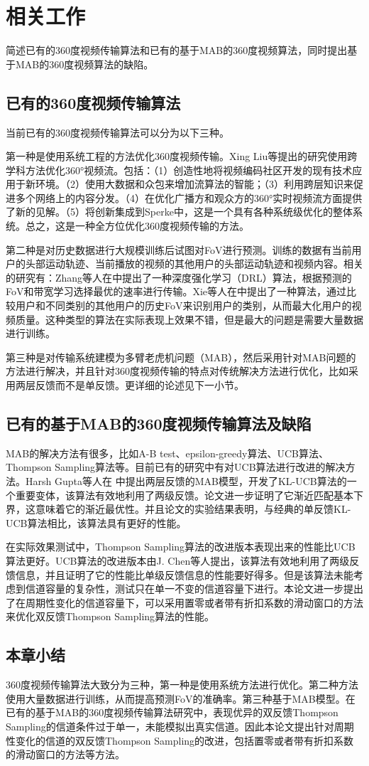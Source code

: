 \chapter{相关工作}
简述已有的360度视频传输算法和已有的基于MAB的360度视频算法，同时提出基于MAB的360度视频算法的缺陷。

\section{已有的360度视频传输算法}
当前已有的360度视频传输算法可以分为以下三种。


第一种是使用系统工程的方法优化360度视频传输。Xing Liu等\cite{ref2}提出的研究使用跨学科方法优化360°视频流。包括：（1）创造性地将视频编码社区开发的现有技术应用于新环境。（2）使用大数据和众包来增加流算法的智能；（3）利用跨层知识来促进多个网络上的内容分发。（4）在优化广播方和观众方的360°实时视频流方面提供了新的见解。（5）将创新集成到Sperke中，这是一个具有各种系统级优化的整体系统。总之，这是一种全方位优化360度视频传输的方法。


第二种是对历史数据进行大规模训练后试图对FoV进行预测。训练的数据有当前用户的头部运动轨迹、当前播放的视频的其他用户的头部运动轨迹和视频内容。相关的研究有：Zhang等人在\cite{ref1}中提出了一种深度强化学习（DRL）算法，根据预测的FoV和带宽学习选择最优的速率进行传输。Xie等人在\cite{ref6}中提出了一种算法，通过比较用户和不同类别的其他用户的历史FoV来识别用户的类别，从而最大化用户的视频质量。这种类型的算法在实际表现上效果不错，但是最大的问题是需要大量数据进行训练。


第三种是对传输系统建模为多臂老虎机问题（MAB），然后采用针对MAB问题的方法进行解决，并且针对360度视频传输的特点对传统解决方法进行优化，比如采用两层反馈而不是单反馈。更详细的论述见下一小节。


\section{已有的基于MAB的360度视频传输算法及缺陷}
MAB的解决方法有很多，比如A-B test、epsilon-greedy算法、UCB算法、Thompson Sampling算法等。目前已有的研究中有对UCB算法进行改进的解决方法。Harsh Gupta等人在\cite{ref7} 中提出两层反馈的MAB模型，开发了KL-UCB算法的一个重要变体，该算法有效地利用了两级反馈。论文进一步证明了它渐近匹配基本下界，这意味着它的渐近最优性。并且论文的实验结果表明，与经典的单反馈KL-UCB算法相比，该算法具有更好的性能。

在实际效果测试中，Thompson Sampling算法的改进版本表现出来的性能比UCB算法更好。UCB算法的改进版本由J. Chen等人\cite{ref8}提出，该算法有效地利用了两级反馈信息，并且证明了它的性能比单级反馈信息的性能要好得多。但是该算法未能考虑到信道容量的复杂性，测试只在单一不变的信道容量下进行。本论文进一步提出了在周期性变化的信道容量下，可以采用置零或者带有折扣系数的滑动窗口的方法来优化双反馈Thompson Sampling算法的性能。

\section{本章小结}
360度视频传输算法大致分为三种，第一种是使用系统方法进行优化。第二种方法使用大量数据进行训练，从而提高预测FoV的准确率。第三种基于MAB模型。在已有的基于MAB的360度视频传输算法研究中，表现优异的双反馈Thompson Sampling的信道条件过于单一，未能模拟出真实信道。因此本论文提出针对周期性变化的信道的双反馈Thompson Sampling的改进，包括置零或者带有折扣系数的滑动窗口的方法等方法。